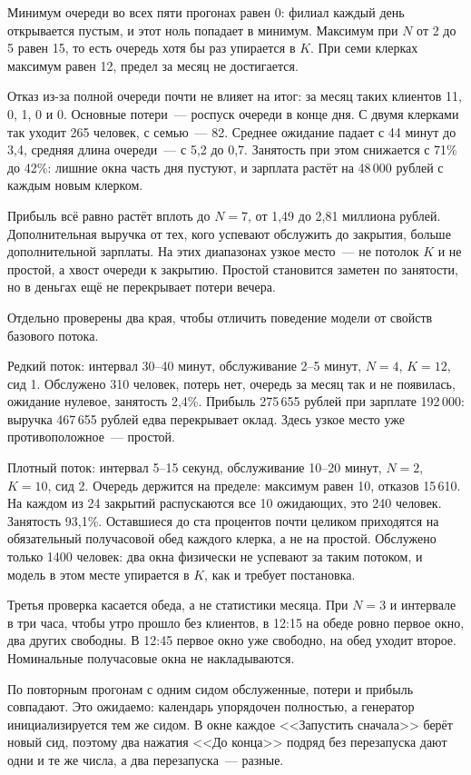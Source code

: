 \documentclass[a4paper,12pt]{article}
\begin{document}
Минимум очереди во всех пяти прогонах равен 0: филиал каждый день открывается пустым, и этот ноль попадает в минимум. Максимум при \(N\) от 2 до 5 равен 15, то есть очередь хотя бы раз упирается в \(K\). При семи клерках максимум равен 12, предел за месяц не достигается.

Отказ из-за полной очереди почти не влияет на итог: за месяц таких клиентов 11, 0, 1, 0 и 0. Основные потери~--- роспуск очереди в конце дня. С двумя клерками так уходит 265 человек, с семью~--- 82. Среднее ожидание падает с 44 минут до 3,4, средняя длина очереди~--- с 5,2 до 0,7. Занятость при этом снижается с 71\% до 42\%: лишние окна часть дня пустуют, и зарплата растёт на 48\,000 рублей с каждым новым клерком.

Прибыль всё равно растёт вплоть до \(N = 7\), от 1,49 до 2,81 миллиона рублей. Дополнительная выручка от тех, кого успевают обслужить до закрытия, больше дополнительной зарплаты. На этих диапазонах узкое место~--- не потолок \(K\) и не простой, а хвост очереди к закрытию. Простой становится заметен по занятости, но в деньгах ещё не перекрывает потери вечера.

Отдельно проверены два края, чтобы отличить поведение модели от свойств базового потока.

Редкий поток: интервал 30--40 минут, обслуживание 2--5 минут, \(N = 4\), \(K = 12\), сид 1. Обслужено 310 человек, потерь нет, очередь за месяц так и не появилась, ожидание нулевое, занятость 2,4\%. Прибыль 275\,655 рублей при зарплате 192\,000: выручка 467\,655 рублей едва перекрывает оклад. Здесь узкое место уже противоположное~--- простой.

Плотный поток: интервал 5--15 секунд, обслуживание 10--20 минут, \(N = 2\), \(K = 10\), сид 2. Очередь держится на пределе: максимум равен 10, отказов 15\,610. На каждом из 24 закрытий распускаются все 10 ожидающих, это 240 человек. Занятость 93,1\%. Оставшиеся до ста процентов почти целиком приходятся на обязательный получасовой обед каждого клерка, а не на простой. Обслужено только 1400 человек: два окна физически не успевают за таким потоком, и модель в этом месте упирается в \(K\), как и требует постановка.

Третья проверка касается обеда, а не статистики месяца. При \(N = 3\) и интервале в три часа, чтобы утро прошло без клиентов, в 12:15 на обеде ровно первое окно, два других свободны. В 12:45 первое окно уже свободно, на обед уходит второе. Номинальные получасовые окна не накладываются.

По повторным прогонам с одним сидом обслуженные, потери и прибыль совпадают. Это ожидаемо: календарь упорядочен полностью, а генератор инициализируется тем же сидом. В окне каждое <<Запустить сначала>> берёт новый сид, поэтому два нажатия <<До конца>> подряд без перезапуска дают одни и те же числа, а два перезапуска~--- разные.
\end{document}

